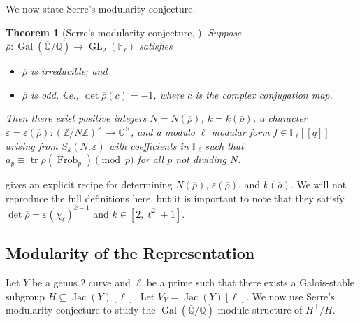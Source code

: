 \documentclass{amsproc}
\numberwithin{equation}{section}
\newtheorem{theorem}[equation]{Theorem}
\theoremstyle{definition}
\theoremstyle{remark}
\DeclareMathOperator{\Jac}{Jac}
\DeclareMathOperator{\GL}{GL}
\DeclareMathOperator{\Frob}{Frob}
\DeclareMathOperator{\Gal}{Gal}
\newcommand{\eps}{\varepsilon}
\newcommand{\ZZ}{\mathbb Z}
\newcommand{\QQ}{\mathbb Q}
\newcommand{\CC}{\mathbb C}
\newcommand{\FF}{\mathbb F}
\newcommand{\Qbar}{\overline{\QQ}}
\newcommand{\GalQ}{\Gal(\Qbar/\QQ)}
\begin{document}
We now state Serre's modularity conjecture.
\begin{theorem}[Serre's modularity conjecture, \cite{modularity}]
    Suppose $\overline\rho : \GalQ \to \GL_2(\FF_\ell)$ satisfies
    \begin{itemize}
    \item $\overline\rho$ is irreducible; and
    \item $\overline\rho$ is odd, i.e., $\det \overline\rho(c) = -1$, where $c$ is the complex conjugation map.
    \end{itemize}
    Then there exist positive integers $N=N(\overline\rho)$, $k=k(\overline\rho)$, a character $\eps=\eps(\overline\rho) : (\ZZ/N\ZZ)^\times \to \CC^\times$, and a modulo $\ell$ modular form $f\in\FF_\ell[[q]]$ arising from $S_k(N,\eps)$ with coefficients in $\FF_\ell$ such that
    $a_p \equiv \operatorname{tr}\rho(\Frob_p)\pmod p$
    for all $p$ not dividing $N$.
\end{theorem}
\cite{serre} gives an explicit recipe for determining $N(\overline\rho)$, $\eps(\overline\rho)$, and $k(\overline\rho)$. We will not reproduce the full definitions here, but it is important to note that they satisfy $\det\overline\rho = \eps (\chi_\ell)^{k-1}$ and $k\in [2,\ell^2+1]$.

\subsection{Modularity of the Representation}
\label{subsec:modularity}
Let $Y$ be a genus $2$ curve and $\ell$ be a prime such that there exists a Galois-stable subgroup $H\subseteq\Jac(Y)[\ell]$.
Let $V_Y = \Jac(Y)[\ell]$.
We now use Serre's modularity conjecture to study the $\GalQ$-module structure of $H^\perp/H$.
\end{document}
